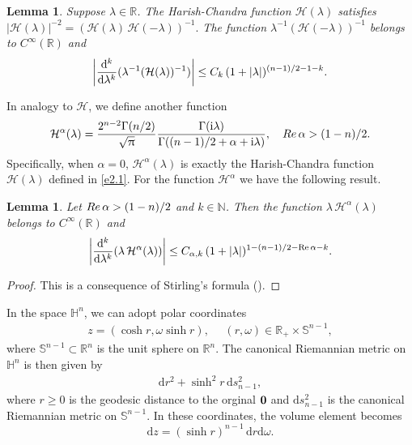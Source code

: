 \documentclass[11pt]{amsproc}
\newcommand{\R}{\mathbb{R}}
\newcommand{\0}{\mathbf{0}}
\newcommand{\bc}{{ \mathcal{H} }}
\renewcommand{\Re}{\mathop{\mathrm{Re}}}
\renewcommand{\SS}{\mathbb{S}}
\renewcommand{\H}{\mathbb{H}}
\renewcommand{\i}{\mathrm{i}}
\renewcommand{\d}{\mathrm{d}}
\numberwithin{equation}{section}
\numberwithin{figure}{section}
\newtheorem{lem}[thm]{Lemma}
\theoremstyle{definition}
\theoremstyle{remark}
\numberwithin{thm}{section}
\begin{document}
\begin{lem}\label{lem:2.0}
Suppose $\lambda\in \R$.
The Harish-Chandra function $\bc(\lambda)$ satisfies
$
|\bc(\lambda)|^{-2}=(\bc(\lambda)\,\bc(-\lambda))^{-1}.
$
The function $ \lambda^{-1}(\bc(-\lambda))^{-1}$ belongs to $C^\infty(\R)$ and
\begin{eqnarray*}
\left|{\d^k\over\d\lambda^k}(\lambda^{-1}(\bc(\lambda))^{-1})\right|\leq C_k\,(1+|\lambda|)^{(n-1)/2-1-k}.
\end{eqnarray*}
\end{lem}


In analogy to $\bc$, we define another function
\begin{eqnarray}\label{e2.2}
\bc^\alpha(\lambda)={2^{n-2}\Gamma(n/2)\over \sqrt{\uppi}}{\Gamma(\i\lambda)\over\Gamma((n-1)/2+\alpha+\i\lambda)}, \ \ \  {\rm Re}\, \alpha>{(1-n)/2}.
\end{eqnarray} 
Specifically, when $\alpha=0$, $\bc^\alpha(\lambda) $ is exactly the Harish-Chandra function $\bc(\lambda)$ defined in \eqref{e2.1}. For the function $\bc^\alpha$ we have the following result.

\begin{lem}\label{lem:2.1}
Let  ${\rm Re}\, \alpha>{(1-n)/2}$ and $k\in{\mathbb N}$.  Then the  function $  \lambda\,\bc^\alpha(\lambda)$ belongs to $C^\infty(\R)$ and
\begin{eqnarray*}
\left|{\d^k\over\d\lambda^k}(\lambda \,\bc^\alpha(\lambda))\right|\leq C_{\alpha,k}\,(1+|\lambda|)^{1-(n-1)/2-\Re\alpha-k}.
\end{eqnarray*}


\end{lem}



\begin{proof}
This is a consequence of  Stirling's formula (\cite[p. 151, Example. (ii)]{Ti}).
\end{proof}
\smallskip

In the space $\H^n$, we can adopt polar coordinates
\begin{eqnarray*}
z=(\cosh r,\omega\sinh r),  \ \ \  \ \ \   (r, \omega) \in {\mathbb R}_+ \times {\mathbb S}^{n-1},
\end{eqnarray*}
where $\SS^{n-1}\subset \R^n$ is the unit sphere on $\R^n$. The canonical Riemannian metric on $\H^n$ is then given by
\begin{eqnarray*}
\d r^2+\sinh^2 r\,\d s_{n-1}^2,
\end{eqnarray*}
where $r\geq 0$ is the geodesic distance to the orginal ${\bf 0}$ and $\d s^2_{n-1}$ is the canonical Riemannian metric on $\SS^{n-1}$. In these coordinates, the volume element becomes
$$\d z= (\sinh r)^{n-1}\, \d r \d\omega.
$$
\end{document}
